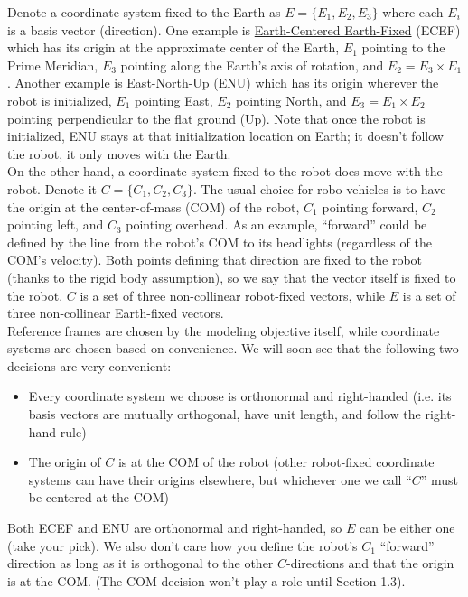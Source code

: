 \documentclass{article}
\begin{document}
Denote a coordinate system fixed to the Earth as $E = \{E_1, E_2, E_3\}$ where each $E_i$ is a basis vector (direction). One example is \href{https://en.wikipedia.org/wiki/ECEF}{Earth-Centered Earth-Fixed} (ECEF) which has its origin at the approximate center of the Earth, $E_1$ pointing to the Prime Meridian, $E_3$ pointing along the Earth's axis of rotation, and $E_2 = E_3 \times E_1$. Another example is \href{https://upload.wikimedia.org/wikipedia/commons/7/73/ECEF_ENU_Longitude_Latitude_relationships.svg}{East-North-Up} (ENU) which has its origin wherever the robot is initialized, $E_1$ pointing East, $E_2$ pointing North, and $E_3 = E_1 \times E_2$ pointing perpendicular to the flat ground (Up). Note that once the robot is initialized, ENU stays at that initialization location on Earth; it doesn't follow the robot, it only moves with the Earth.\\

On the other hand, a coordinate system fixed to the robot does move with the robot. Denote it $C = \{C_1, C_2, C_3\}$. The usual choice for robo-vehicles is to have the origin at the center-of-mass (COM) of the robot, $C_1$ pointing forward, $C_2$ pointing left, and $C_3$ pointing overhead. As an example, ``forward'' could be defined by the line from the robot's COM to its headlights (regardless of the COM's velocity). Both points defining that direction are fixed to the robot (thanks to the rigid body assumption), so we say that the vector itself is fixed to the robot. $C$ is a set of three non-collinear robot-fixed vectors, while $E$ is a set of three non-collinear Earth-fixed vectors.\\

Reference frames are chosen by the modeling objective itself, while coordinate systems are chosen based on convenience. We will soon see that the following two decisions are very convenient:
\begin{itemize}
  \item Every coordinate system we choose is orthonormal and right-handed (i.e. its basis vectors are mutually orthogonal, have unit length, and follow the right-hand rule)
  \item The origin of $C$ is at the COM of the robot (other robot-fixed coordinate systems can have their origins elsewhere, but whichever one we call ``$C$'' must be centered at the COM)
\end{itemize}

Both ECEF and ENU are orthonormal and right-handed, so $E$ can be either one (take your pick). We also don't care how you define the robot's $C_1$ ``forward'' direction as long as it is orthogonal to the other $C$-directions and that the origin is at the COM. (The COM decision won't play a role until Section 1.3).\\
\end{document}
